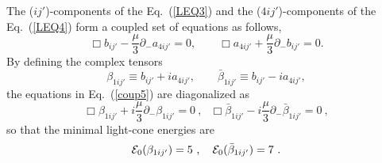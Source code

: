 \documentclass[a4paper,12pt]{article}
\numberwithin{equation}{section}
\begin{document}
The ($ij'$)-components of the Eq.~(\ref{LEQ3}) and the
($4ij'$)-components of the Eq.~(\ref{LEQ4}) form a coupled set of
equations as follows,
\begin{equation}\label{coup5}
\Box b_{ij'} - \frac{\mu}3 \partial_- a_{4ij'} = 0, \qquad \Box
a_{4ij'} + \frac{\mu}3\partial_- b_{ij'} = 0.
\end{equation}
By defining the complex tensors
\begin{equation}\label{mod5}
\beta_{1ij'} \equiv b_{ij'} + i a_{4ij'}, \qquad \bar\beta_{1ij'}
\equiv b_{ij'} - i a_{4ij'},
\end{equation}
the equations in Eq.~(\ref{coup5}) are diagonalized as
\begin{equation}\label{dia5}
\Box \beta_{1ij'}
   + i \frac{\mu}{3} \partial_- \beta_{1ij'} = 0 ~,~~~
\Box \bar\beta_{1ij'}
   - i \frac{\mu}{3} \partial_- \bar\beta_{1ij'} = 0 ~,
\end{equation}
so that the minimal light-cone energies are
\begin{equation}\label{eng5}
{\cal E}_0(\beta_{1ij'}) = 5 ~,~~~
{\cal E}_0(\bar\beta_{1ij'}) = 7 ~.
\end{equation}
\end{document}
